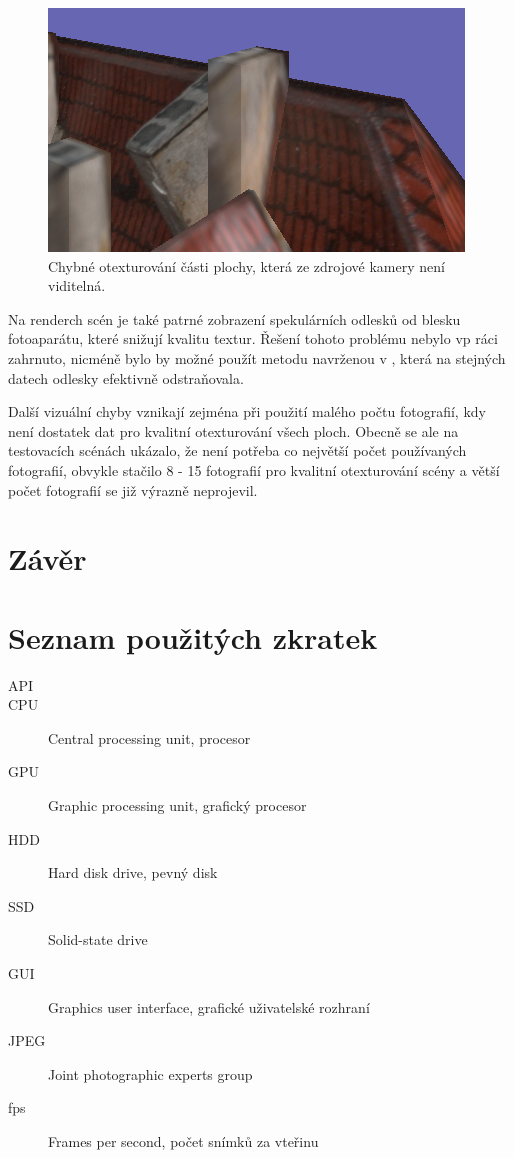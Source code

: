 \documentclass[11pt,twoside,a4paper]{book}
\begin{document}
\begin{figure}[h]
\begin{center}
\includegraphics{figures/err-2}
\caption{Chybné otexturování části plochy, která ze zdrojové kamery není viditelná.}
\label{fig:err-2}
\end{center}
\end{figure}

Na renderch scén je také patrné zobrazení spekulárních odlesků od blesku fotoaparátu, které snižují kvalitu textur. Řešení tohoto problému nebylo vp ráci zahrnuto, nicméně bylo by možné použít metodu navrženou v \cite{Kirschner08}, která na stejných datech odlesky efektivně odstraňovala.

Další vizuální chyby vznikají zejména při použití malého počtu fotografií, kdy není dostatek dat pro kvalitní otexturování všech ploch. Obecně se ale na testovacích scénách ukázalo, že není potřeba co největší počet používaných fotografií, obvykle stačilo 8 - 15 fotografií pro kvalitní otexturování scény a větší počet fotografií se již výrazně neprojevil.



\chapter{Závěr}
\label{chap:end}


\renewcommand\refname{Zdroje}

\def\CS{$\cal C\kern-0.1667em\lower.5ex\hbox{$\cal S$}\kern-0.075em $}



\appendix


\chapter{Seznam použitých zkratek}

\begin{description}
\item[API]
\item[CPU] Central processing unit, procesor
\item[GPU] Graphic processing unit, grafický procesor
\item[HDD] Hard disk drive, pevný disk
\item[SSD] Solid-state drive
\item[GUI] Graphics user interface, grafické uživatelské rozhraní
\item[JPEG]  Joint photographic experts group
\item[fps]  Frames per second, počet snímků za vteřinu
\end{description}
\end{document}
